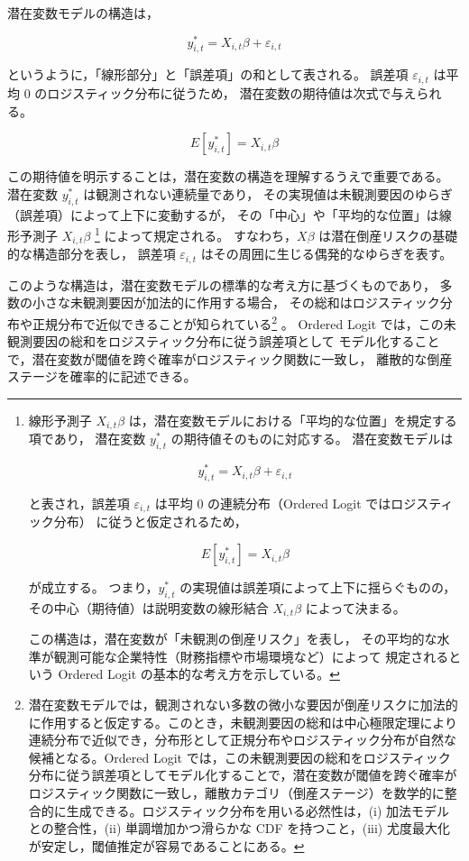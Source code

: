 潜在変数モデルの構造は，



\[
y^*_{i,t} = X_{i,t}\beta + \varepsilon_{i,t}
\]



というように，「線形部分」と「誤差項」の和として表される。
誤差項 $\varepsilon_{i,t}$ は平均 0 のロジスティック分布に従うため，
潜在変数の期待値は次式で与えられる。



\[
E[y^*_{i,t}] = X_{i,t}\beta
\]



この期待値を明示することは，潜在変数の構造を理解するうえで重要である。
潜在変数 $y^*_{i,t}$ は観測されない連続量であり，
その実現値は未観測要因のゆらぎ（誤差項）によって上下に変動するが，
その「中心」や「平均的な位置」は線形予測子 $X_{i,t}\beta$ \footnote{
線形予測子 $X_{i,t}\beta$ は，潜在変数モデルにおける「平均的な位置」を規定する項であり，
潜在変数 $y^*_{i,t}$ の期待値そのものに対応する。
潜在変数モデルは


\[
y^*_{i,t} = X_{i,t}\beta + \varepsilon_{i,t}
\]


と表され，誤差項 $\varepsilon_{i,t}$ は平均 0 の連続分布（Ordered Logit ではロジスティック分布）
に従うと仮定されるため，


\[
E[y^*_{i,t}] = X_{i,t}\beta
\]


が成立する。
つまり，$y^*_{i,t}$ の実現値は誤差項によって上下に揺らぐものの，
その中心（期待値）は説明変数の線形結合 $X_{i,t}\beta$ によって決まる。

この構造は，潜在変数が「未観測の倒産リスク」を表し，
その平均的な水準が観測可能な企業特性（財務指標や市場環境など）によって
規定されるという Ordered Logit の基本的な考え方を示している。
}
によって規定される。
すなわち，$X\beta$ は潜在倒産リスクの基礎的な構造部分を表し，
誤差項 $\varepsilon_{i,t}$ はその周囲に生じる偶発的なゆらぎを表す。

このような構造は，潜在変数モデルの標準的な考え方に基づくものであり，
多数の小さな未観測要因が加法的に作用する場合，
その総和はロジスティック分布や正規分布で近似できることが知られている\footnote{
潜在変数モデルでは，観測されない多数の微小な要因が倒産リスクに加法的に作用すると仮定する。このとき，未観測要因の総和は中心極限定理により連続分布で近似でき，分布形として正規分布やロジスティック分布が自然な候補となる。Ordered Logit では，この未観測要因の総和をロジスティック分布に従う誤差項としてモデル化することで，潜在変数が閾値を跨ぐ確率がロジスティック関数に一致し，離散カテゴリ（倒産ステージ）を数学的に整合的に生成できる。ロジスティック分布を用いる必然性は，(i) 加法モデルとの整合性，(ii) 単調増加かつ滑らかな CDF を持つこと，(iii) 尤度最大化が安定し，閾値推定が容易であることにある。
}
。
Ordered Logit では，この未観測要因の総和をロジスティック分布に従う誤差項として
モデル化することで，潜在変数が閾値を跨ぐ確率がロジスティック関数に一致し，
離散的な倒産ステージを確率的に記述できる。

